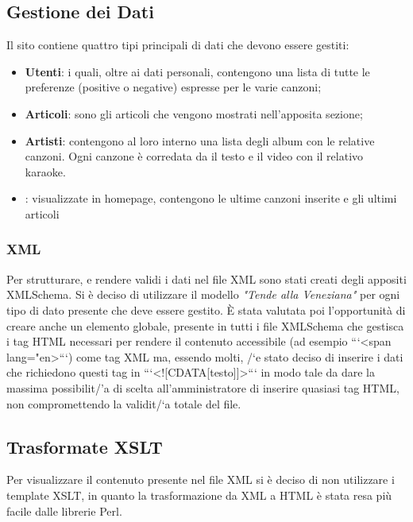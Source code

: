 \subsection{Gestione dei Dati}
Il sito contiene quattro tipi principali di dati che devono essere gestiti:
\begin{itemize}
    \item \textbf{Utenti}: i quali, oltre ai dati personali, contengono una lista di tutte le preferenze (positive o negative) espresse per le varie canzoni;
    \item \textbf{Articoli}: sono gli articoli che vengono mostrati nell'apposita sezione;
    \item \textbf{Artisti}: contengono al loro interno una lista degli album con le relative canzoni. Ogni canzone \`e corredata da il testo e il video con il relativo karaoke.
    \item {}: visualizzate in homepage, contengono le ultime canzoni inserite e gli ultimi articoli
\end{itemize}

\subsubsection{XML}

Per strutturare, e rendere validi i dati nel file XML sono stati creati degli appositi XMLSchema.
Si \`e deciso di utilizzare il modello \textit{"Tende alla Veneziana"} per ogni tipo di dato presente che deve essere gestito.
\`E stata valutata poi l'opportunit\`a di creare anche un elemento globale, presente in tutti i file XMLSchema che gestisca i tag HTML necessari per rendere il contenuto accessibile (ad esempio ```<span lang="en>```) come tag XML ma, essendo molti, /`e stato deciso di inserire i dati che richiedono questi tag in ```<![CDATA[testo]]>``` in modo tale da dare la massima possibilit/'a di scelta all'amministratore di inserire quasiasi tag HTML, non compromettendo la validit/`a totale del file.

\subsection{Trasformate XSLT}

Per visualizzare il contenuto presente nel file XML si \`e deciso di non utilizzare i template XSLT, in quanto la trasformazione da XML a HTML \`e stata resa pi\`u facile dalle librerie Perl.
